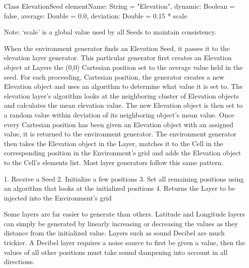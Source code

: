Class ElevationSeed {
	elementName: String = "Elevation",
    	dynamic: Boolean = false,
    	average: Double = 0.0,
    	deviation: Double = 0.15 * scale
}

Note: ‘scale’ is a global value used by all Seeds to maintain consistency.

When the environment generator finds an Elevation Seed, it passes it to the elevation layer generator.
This particular generator first creates an Elevation object at Layers the (0,0) Cartesian position set to the average value held in the seed.
For each proceeding, Cartesian position, the generator creates a new Elevation object and uses an algorithm to determine what value it is set to.
The elevation layer’s algorithm looks at the neighboring cluster of Elevation objects and calculates the mean elevation value.
The new Elevation object is then set to a random value within deviation of its neighboring object’s mean value.
Once every Cartesian position has been given an Elevation object with an assigned value, it is returned to the environment generator.
The environment generator then takes the Elevation object in the Layer, matches it to the Cell in the corresponding position in the Environment’s grid and adds the Elevation object to the Cell’s elements list.
Most layer generators follow this same pattern.

1.	Receive a Seed
2.	Initialize a few positions
3.	Set all remaining positions using an algorithm that looks at the initialized positions
4.	Returns the Layer to be injected into the Environment’s grid

Some layers are far easier to generate than others.
Latitude and Longitude layers can simply be generated by linearly increasing or decreasing the values as they distance from the initialized value.
Layers such as sound Decibel are much trickier.
A Decibel layer requires a noise source to first be given a value, then the values of all other positions must take sound dampening into account in all directions.

